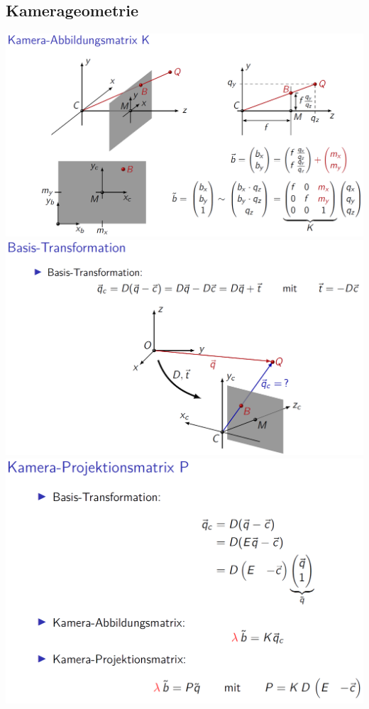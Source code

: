	\subsection{Kamerageometrie}		 
		 \includegraphics[width=0.9\linewidth]{Bilder/kamera1} \\
		 
		 \includegraphics[width=0.9\linewidth]{Bilder/kamera2} \\
		 
		 \includegraphics[width=0.9\linewidth]{Bilder/kamera3} \\
		 
